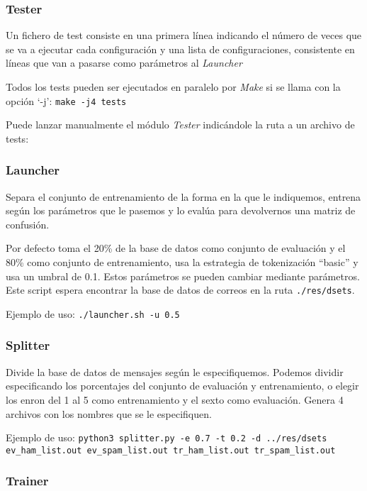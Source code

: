 \subsubsection{Tester}

Un fichero de test consiste en una primera línea indicando el número de veces
que se va a ejecutar cada configuración y una lista de configuraciones,
consistente en líneas que van a pasarse como parámetros al \textit{Launcher}

Todos los tests pueden ser ejecutados en paralelo por \textit{Make} si se llama
con la opción `-j': \texttt{make -j4 tests}

Puede lanzar manualmente el módulo \textit{Tester} indicándole la ruta a un
archivo de tests\helpfn:

\subsubsection{Launcher}

Separa el conjunto de entrenamiento de la forma en la que le indiquemos, entrena
según los parámetros que le pasemos y lo evalúa para devolvernos una matriz de
confusión.

Por defecto toma el 20\% de la base de datos como conjunto de evaluación y el
80\% como conjunto de entrenamiento, usa la estrategia de tokenización ``basic''
y usa un umbral de 0.1. Estos parámetros se pueden cambiar mediante
parámetros\helpfn. Este script espera encontrar la base de datos de correos en
la ruta \texttt{./res/dsets}.

Ejemplo de uso: \texttt{./launcher.sh -u 0.5}

\subsubsection{Splitter}

Divide la base de datos de mensajes según le especifiquemos. Podemos dividir
especificando los porcentajes del conjunto de evaluación y entrenamiento, o
elegir los enron del 1 al 5 como entrenamiento y el sexto como
evaluación\helpfn. Genera 4 archivos con los nombres que se le especifiquen.

Ejemplo de uso: \texttt{python3 splitter.py -e 0.7 -t 0.2 -d ../res/dsets ev\_ham\_list.out ev\_spam\_list.out tr\_ham\_list.out tr\_spam\_list.out}

\subsubsection{Trainer}

